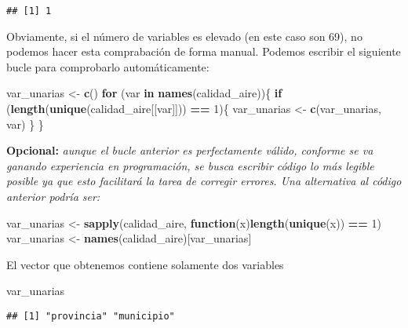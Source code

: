 \documentclass[]{article}
\newenvironment{Shaded}{\begin{snugshade}}{\end{snugshade}}
\newcommand{\ControlFlowTok}[1]{\textcolor[rgb]{0.13,0.29,0.53}{\textbf{#1}}}
\newcommand{\DecValTok}[1]{\textcolor[rgb]{0.00,0.00,0.81}{#1}}
\newcommand{\KeywordTok}[1]{\textcolor[rgb]{0.13,0.29,0.53}{\textbf{#1}}}
\newcommand{\NormalTok}[1]{#1}
\newcommand{\OperatorTok}[1]{\textcolor[rgb]{0.81,0.36,0.00}{\textbf{#1}}}
\newcommand{\StringTok}[1]{\textcolor[rgb]{0.31,0.60,0.02}{#1}}
\begin{document}
\begin{verbatim}
## [1] 1
\end{verbatim}

Obviamente, si el número de variables es elevado (en este caso son 69),
no podemos hacer esta comprabación de forma manual. Podemos escribir el
siguiente bucle para comprobarlo automáticamente:

\begin{Shaded}
\begin{Highlighting}[]
\NormalTok{var_unarias <-}\StringTok{ }\KeywordTok{c}\NormalTok{()}
\ControlFlowTok{for}\NormalTok{ (var }\ControlFlowTok{in} \KeywordTok{names}\NormalTok{(calidad_aire))\{}
  \ControlFlowTok{if}\NormalTok{ (}\KeywordTok{length}\NormalTok{(}\KeywordTok{unique}\NormalTok{(calidad_aire[[var]])) }\OperatorTok{==}\StringTok{ }\DecValTok{1}\NormalTok{)\{}
\NormalTok{    var_unarias <-}\StringTok{ }\KeywordTok{c}\NormalTok{(var_unarias, var)}
\NormalTok{  \}}
\NormalTok{\}}
\end{Highlighting}
\end{Shaded}

\textbf{Opcional:} \emph{aunque el bucle anterior es perfectamente
válido, conforme se va ganando experiencia en programación, se busca
escribir código lo más legible posible ya que esto facilitará la tarea
de corregir errores. Una alternativa al código anterior podría ser:}

\begin{Shaded}
\begin{Highlighting}[]
\NormalTok{var_unarias <-}\StringTok{ }\KeywordTok{sapply}\NormalTok{(calidad_aire, }\ControlFlowTok{function}\NormalTok{(x)}\KeywordTok{length}\NormalTok{(}\KeywordTok{unique}\NormalTok{(x)) }\OperatorTok{==}\StringTok{ }\DecValTok{1}\NormalTok{)}
\NormalTok{var_unarias <-}\StringTok{ }\KeywordTok{names}\NormalTok{(calidad_aire)[var_unarias]}
\end{Highlighting}
\end{Shaded}

El vector que obtenemos contiene solamente dos variables

\begin{Shaded}
\begin{Highlighting}[]
\NormalTok{var_unarias}
\end{Highlighting}
\end{Shaded}

\begin{verbatim}
## [1] "provincia" "municipio"
\end{verbatim}
\end{document}
